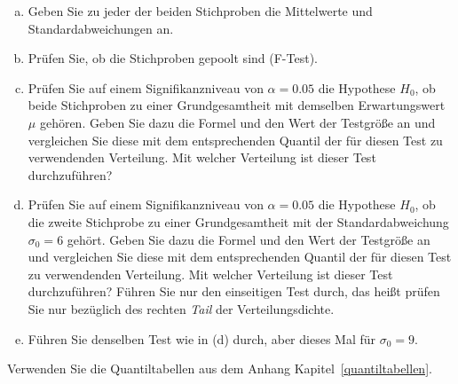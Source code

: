 \begin{enumerate}[a)]
\item Geben Sie zu jeder der beiden Stichproben die Mittelwerte und Standardabweichungen an.
\item Prüfen Sie, ob die Stichproben gepoolt sind (F-Test).
\item Prüfen Sie auf einem Signifikanzniveau von $\alpha = 0.05$ die Hypothese $H_0$,
 ob beide Stichproben zu einer Grundgesamtheit
 mit demselben Erwartungswert $\mu$ gehören. Geben Sie dazu die Formel und den Wert
 der Testgröße an und vergleichen Sie diese mit dem entsprechenden Quantil der für diesen
 Test zu verwendenden Verteilung. Mit welcher Verteilung ist dieser Test durchzuführen?
\item Prüfen Sie auf einem Signifikanzniveau von $\alpha = 0.05$ die Hypothese $H_0$,
 ob die zweite Stichprobe zu einer Grundgesamtheit
 mit der Standardabweichung $\sigma_0 = 6$ gehört. Geben Sie dazu die Formel und den Wert
 der Testgröße an und vergleichen Sie diese mit dem entsprechenden Quantil der für diesen
 Test zu verwendenden Verteilung. Mit welcher Verteilung ist dieser Test durchzuführen?
 Führen Sie nur den einseitigen Test durch, das heißt prüfen Sie nur bezüglich
 des rechten \textsl{Tail} der Verteilungsdichte.
\item Führen Sie denselben Test wie in (d) durch, aber dieses Mal für $\sigma_0 = 9$.
\end{enumerate}

Verwenden Sie die Quantiltabellen aus dem Anhang Kapitel~\ref{quantiltabellen}.


\newpage

